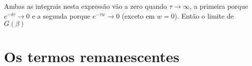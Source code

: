     Ambas as integrais nesta expressão vão a zero quando $\tau \to \infty$, a primeira porque $e^{-\delta \tau} \to 0$ e a segunda porque $e^{- \tau w} \to 0$ (exceto em $w = 0$). Então o limite de $G(\beta)$
    
    
    
    
    
    
    \section{Os termos remanescentes} \label{sec-1-16}
    
    
    
    
    
    
    
    
    
    
    
    
    
    
    
    













